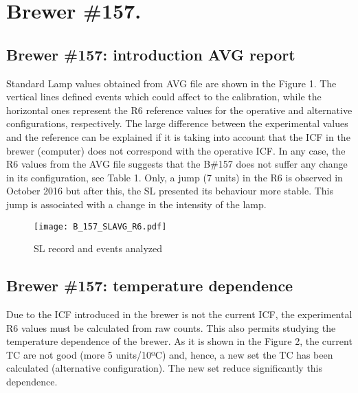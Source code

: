 \documentclass[../main.tex]{subfiles}
\begin{document}
 

\section{Brewer \#157.}

\subsection{Brewer \#157: introduction AVG report}

Standard Lamp values obtained from AVG file are shown in the Figure 1. The vertical lines defined events which could affect to the calibration, while the horizontal ones represent the R6 reference values for the operative and alternative configurations, respectively. The large difference between the experimental values and the reference can be explained if it is taking into account that the ICF in the brewer (computer) does not correspond with the operative ICF. In any case, the R6 values from the AVG file suggests that the B\#157 does not suffer any change in its configuration, see Table 1. Only, a jump (7 units) in the R6 is observed in October 2016 but after this, the SL presented its behaviour more stable. This jump is associated with a change in the intensity of the lamp.
 
 \begin{sidewaysfigure}[h]
\texttt{[image: B\_157\_SLAVG\_R6.pdf]}
\label{fig:SL_events}
\caption{SL record and events analyzed}
\end{sidewaysfigure}

 
 \begin{sidewaystable}[h]

        {}
        {}
 
\end{sidewaystable}
 
\subsection{Brewer \#157: temperature dependence} 
Due to the ICF introduced in the brewer is not the current ICF, the experimental R6 values must be calculated from raw counts. This also permits studying the temperature dependence of the brewer. As it is shown in the Figure 2, the current TC are not good (more 5 units/10ºC) and, hence, a new set the TC has been calculated (alternative configuration).  The new set reduce significantly this dependence.
\end{document}
